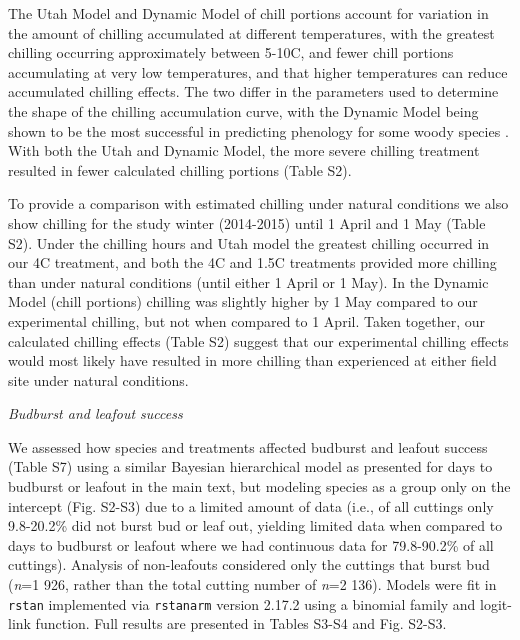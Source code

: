 \documentclass{article}
\begin{document}
\noindent The Utah Model and Dynamic Model of chill portions account for variation in the amount of chilling accumulated at different temperatures, with the greatest chilling occurring approximately between 5-10\degree C, and fewer chill portions accumulating at very low temperatures, and that higher temperatures can reduce accumulated chilling effects. The two differ in the parameters used to determine the shape of the chilling accumulation curve, with the Dynamic Model being shown to be the most successful in predicting phenology for some woody species \citep{Luedeling:2009}. With both the Utah and Dynamic Model, the more severe chilling treatment resulted in fewer calculated chilling portions (Table S2). 

\noindent To provide a comparison with estimated chilling under natural conditions we also show chilling for the study winter (2014-2015) until 1 April and 1 May (Table S2). Under the chilling hours and Utah model the greatest chilling occurred in our 4\degree C treatment, and both the 4\degree C and 1.5\degree C treatments provided more chilling than under natural conditions (until either 1 April or 1 May). In the Dynamic Model (chill portions) chilling was slightly higher by 1 May compared to our experimental chilling, but not when compared to 1 April. Taken together, our calculated chilling effects (Table S2) suggest that our experimental chilling effects would most likely have resulted in more chilling than experienced at either field site under natural conditions. 

\noindent\emph{Budburst and leafout success}

\noindent We assessed how species and treatments affected budburst and leafout success (Table S7) using a similar Bayesian hierarchical model as presented for days to budburst or leafout in the main text, but modeling species as a group only on the intercept (Fig. S2-S3) due to a limited amount of data (i.e., of all cuttings only 9.8-20.2\% did not burst bud or leaf out, yielding limited data when compared to days to budburst or leafout where we had continuous data for 79.8-90.2\% of all cuttings). Analysis of non-leafouts considered only the cuttings that burst bud (\emph{n}=1 926, rather than the total cutting number of \emph{n}=2 136). Models were fit in \verb|rstan| implemented via  \verb|rstanarm| version 2.17.2 using a binomial family and logit-link function. Full results are presented in Tables S3-S4 and Fig. S2-S3.
\end{document}
